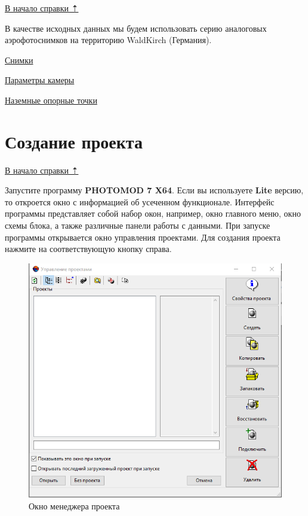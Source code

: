 \documentclass[
  12pt,
]{book}
\begin{document}
\protect\hyperlink{photomod}{В начало справки ⇡}

В качестве исходных данных мы будем использовать серию аналоговых аэрофотоснимков на территорию WaldKirch (Германия).

\href{https://disk.yandex.ru/d/vxx2kKksx5Hyfw}{Снимки}

\href{https://disk.yandex.ru/d/7xvAgKMJ7xIavg}{Параметры камеры}

\href{https://disk.yandex.ru/d/ZFQWVoHlaKIGUA}{Наземные опорные точки}

\hypertarget{photomod-create_project}{%
\section{Создание проекта}\label{photomod-create_project}}

\protect\hyperlink{photomod}{В начало справки ⇡}

Запустите программу \textbf{PHOTOMOD 7 X64}. Если вы используете \textbf{Lite} версию, то откроется окно с информацией об усеченном функционале. Интерфейс программы представляет собой набор окон, например, окно главного меню, окно схемы блока, а также различные панели работы с данными. При запуске программы открывается окно управления проектами. Для создания проекта нажмите на соответствующую кнопку справа.

\begin{figure}
\centering
\includegraphics{images/Ref15/Project_Manager.png}
\caption{Окно менеджера проекта}
\end{figure}
\end{document}
